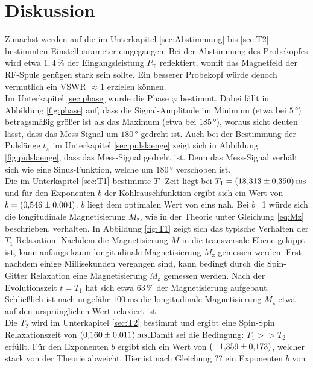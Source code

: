 \section{Diskussion}
\label{sec:Diskussion}
Zunächst werden auf die im Unterkapitel \ref{sec:Abstimmung} bis \ref{sec:T2}
bestimmten Einstellparameter eingegangen.
Bei der Abstimmung des Probekopfes wird etwa $1,4\,\%$ der Eingangsleistung
$P_{\text{T}}$ reflektiert, womit das Magnetfeld der RF-Spule genügen stark sein
sollte. Ein besserer Probekopf würde denoch vermutlich ein VSWR $\approx1$ erzielen
können.\\
Im Unterkapitel \ref{sec:phase} wurde die Phase $\varphi$ bestimmt. Dabei fällt
in Abbildung \ref{fig:phase} auf, dass die Signal-Amplitude im Minimum (etwa bei $5\,°$)
betragsmäßig größer ist als das Maximum (etwa bei $185\,°$), woraus sicht deuten
lässt, dass das Mess-Signal um $180\,°$ gedreht ist.
Auch bei der Bestimmung der Pulslänge $t_{\pi}$ im Unterkapitel \ref{sec:pulslaenge}
zeigt sich in Abbildung \ref{fig:pulslaenge}, dass das Mess-Signal gedreht ist.
Denn das Mess-Signal verhält sich wie eine Sinus-Funktion, welche um $180\,°$
verschoben ist.\\
Die im Unterkapitel \ref{sec:T1} bestimmte $T_1$-Zeit liegt bei
$T_1 = \SI{18.313\pm0.350}{\milli\second}$ und für den Exponenten $b$ der
Kohlrauschfunktion ergibt sich ein Wert von $b = \SI{0,546\pm0,004}{}$. $b$ liegt
dem optimalen Wert von eins nah. Bei $b$=1 würde sich die longitudinale
Magnetisierung $M_{\text{z}}$, wie in der Theorie unter Gleichung \ref{eq:Mz}
beschrieben, verhalten. In Abbildung \ref{fig:T1} zeigt sich das typische Verhalten
der $T_1$-Relaxation. Nachdem die Magnetisierung $M$ in die transversale Ebene gekippt ist,
kann anfangs kaum longitudinale Magnetisierung $M_{\text{z}}$ gemessen werden.
Erst nachdem einige Millisekunden vergangen sind, kann bedingt durch die Spin-Gitter
Relaxation eine Magnetisierung $M_{\text{z}}$ gemessen werden. Nach der Evolutionszeit
$t=T_1$ hat sich etwa $63\,\%$ der Magnetisierung aufgebaut. Schließlich ist nach
ungefähr $\SI{100}{\milli\second}$ die longitudinale Magnetisierung $M_{\text{z}}$
etwa auf den ursprünglichen Wert relaxiert ist.\\
Die $T_2$ wird im Unterkapitel \ref{sec:T2} bestimmt und ergibt eine Spin-Spin
Relaxationszeit von $\SI{0.160\pm0.011}{\milli\second}$.Damit sei die Bedingung:
$T_1 >> T_2$ erfüllt.
Für den Exponenten $b$ ergibt sich ein Wert von $\SI{-1,359\pm0,173}{}$, welcher
stark von der Theorie abweicht. Hier ist nach Gleichung ?? ein Exponenten $b$ von
